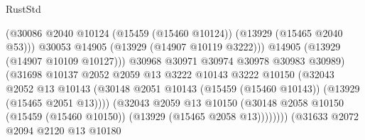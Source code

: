 \begin{lexlean}{RustStd}
\begin{coremodule}
                                              (@30086
                                                @2040
                                                @10124
                                                (@15459 (@15460 @10124))
                                                (@13929 (@15465 @2040 @53)))
                                              @30053
                                              @14905
                                              (@13929 (@14907 @10119 @3222)))
                                            @14905
                                            (@13929 (@14907 @10109 @10127)))
                                          @30968
                                          @30971
                                          @30974
                                          @30978
                                          @30983
                                          @30989)
                                        (@31698
                                          @10137
                                          @2052
                                          @2059
                                          @13
                                          @3222
                                          @10143
                                          @3222
                                          @10150
                                          (@32043
                                            @2052
                                            @13
                                            @10143
                                            (@30148
                                              @2051
                                              @10143
                                              (@15459 (@15460 @10143))
                                              (@13929 (@15465 @2051 @13))))
                                          (@32043
                                            @2059
                                            @13
                                            @10150
                                            (@30148
                                              @2058
                                              @10150
                                              (@15459 (@15460 @10150))
                                              (@13929 (@15465 @2058 @13))))))))
                                  (@31633
                                    @2072
                                    @2094
                                    @2120
                                    @13
                                    @10180

\end{coremodule}
\end{lexlean}

